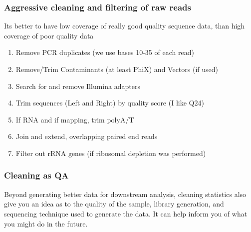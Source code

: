 \documentclass[pdf]{beamer}
\begin{document}
\begin{frame}
\frametitle{Aggressive cleaning and filtering of raw reads}
\alert{Its better to have low coverage of really good quality sequence data, than high coverage of poor quality data}
\vspace{0.5cm}
\begin{enumerate}
\item Remove PCR duplicates (we use bases 10-35 of each read)
\item Remove/Trim Contaminants (at least PhiX) and Vectors (if used)
\item Search for and remove Illumina adapters
\item Trim sequences (Left and Right) by quality score (I like Q24)
\item If RNA and if mapping, trim polyA/T
\item Join and extend, overlapping paired end reads
\item Filter out rRNA genes (if ribosomal depletion was performed)
\end{enumerate}
\end{frame}

\begin{frame}
\frametitle{Cleaning as QA}
Beyond generating better data for downstream analysis, cleaning statistics also give you an idea as to the quality of the sample, library generation, and sequencing technique used to generate the data. It can help inform you of what you might do in the future.
\end{frame}
\end{document}
